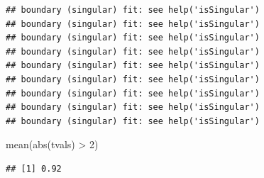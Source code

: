 \documentclass[
  12pt,
]{krantz}
\newenvironment{Shaded}{\begin{snugshade}}{\end{snugshade}}
\newcommand{\AttributeTok}[1]{\textcolor[rgb]{0.77,0.63,0.00}{#1}}
\newcommand{\ConstantTok}[1]{\textcolor[rgb]{0.00,0.00,0.00}{#1}}
\newcommand{\ControlFlowTok}[1]{\textcolor[rgb]{0.13,0.29,0.53}{\textbf{#1}}}
\newcommand{\DecValTok}[1]{\textcolor[rgb]{0.00,0.00,0.81}{#1}}
\newcommand{\DocumentationTok}[1]{\textcolor[rgb]{0.56,0.35,0.01}{\textbf{\textit{#1}}}}
\newcommand{\FunctionTok}[1]{\textcolor[rgb]{0.00,0.00,0.00}{#1}}
\newcommand{\NormalTok}[1]{#1}
\newcommand{\OtherTok}[1]{\textcolor[rgb]{0.56,0.35,0.01}{#1}}
\newcommand{\SpecialCharTok}[1]{\textcolor[rgb]{0.00,0.00,0.00}{#1}}
\newcommand{\StringTok}[1]{\textcolor[rgb]{0.31,0.60,0.02}{#1}}
\theoremstyle{definition}
\theoremstyle{definition}
\theoremstyle{definition}
\theoremstyle{definition}
\theoremstyle{remark}
\begin{document}
\begin{Shaded}
\end{Shaded}

\begin{verbatim}
## boundary (singular) fit: see help('isSingular')
## boundary (singular) fit: see help('isSingular')
## boundary (singular) fit: see help('isSingular')
## boundary (singular) fit: see help('isSingular')
## boundary (singular) fit: see help('isSingular')
## boundary (singular) fit: see help('isSingular')
## boundary (singular) fit: see help('isSingular')
## boundary (singular) fit: see help('isSingular')
## boundary (singular) fit: see help('isSingular')
\end{verbatim}

\begin{Shaded}
\begin{Highlighting}[]
\FunctionTok{mean}\NormalTok{(}\FunctionTok{abs}\NormalTok{(tvals) }\SpecialCharTok{\textgreater{}} \DecValTok{2}\NormalTok{)}
\end{Highlighting}
\end{Shaded}

\begin{verbatim}
## [1] 0.92
\end{verbatim}

\begin{Shaded}
\end{Shaded}
\end{document}
